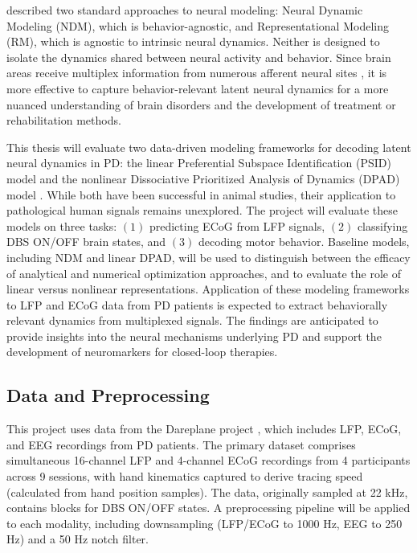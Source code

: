 \documentclass[12pt, letterpaper]{article}
\begin{document}
\textcite{saniModelingBehaviorallyRelevant2021} described two standard approaches to neural modeling: Neural Dynamic Modeling (NDM), which is behavior-agnostic, and Representational Modeling (RM), which is agnostic to intrinsic neural dynamics. Neither is designed to isolate the dynamics shared between neural activity and behavior. Since brain areas receive multiplex information from numerous afferent neural sites \parencite{wuMixedSelectivitySubthalamic2025}, it is more effective to capture behavior-relevant latent neural dynamics for a more nuanced understanding of brain disorders and the development of treatment or rehabilitation methods.

This thesis will evaluate two data-driven modeling frameworks for decoding latent neural dynamics in PD: the linear Preferential Subspace Identification (PSID) model \parencite{saniModelingBehaviorallyRelevant2021} and the nonlinear Dissociative Prioritized Analysis of Dynamics (DPAD) model \parencite{saniDissociativePrioritizedModeling2024}. While both have been successful in animal studies, their application to pathological human signals remains unexplored. The project will evaluate these models on three tasks: $(1)$ predicting ECoG from LFP signals, $(2)$ classifying DBS ON/OFF brain states, and $(3)$ decoding motor behavior. Baseline models, including NDM and linear DPAD, will be used to distinguish between the efficacy of analytical and numerical optimization approaches, and to evaluate the role of linear versus nonlinear representations. Application of these modeling frameworks to LFP and ECoG data from PD patients is expected to extract behaviorally relevant dynamics from multiplexed signals. The findings are anticipated to provide insights into the neural mechanisms underlying PD and support the development of neuromarkers for closed-loop therapies.

\subsection{Data and Preprocessing}
This project uses data from the Dareplane project \parencite{doldLFPECoGData2024}, which includes LFP, ECoG, and EEG recordings from PD patients. The primary dataset comprises simultaneous 16-channel LFP and 4-channel ECoG recordings from 4 participants across 9 sessions, with hand kinematics captured to derive tracing speed (calculated from hand position samples). The data, originally sampled at 22 kHz, contains blocks for DBS ON/OFF states. A preprocessing pipeline will be applied to each modality, including downsampling (LFP/ECoG to 1000 Hz, EEG to 250 Hz) and a 50 Hz notch filter.
\end{document}
